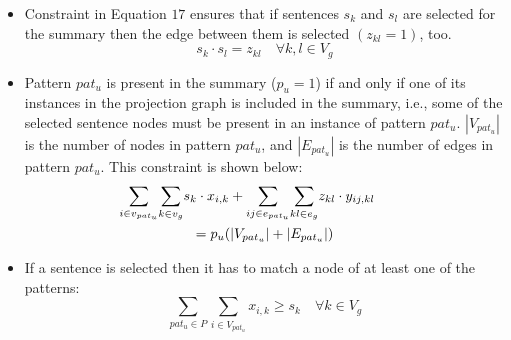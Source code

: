\begin{itemize}

\item Constraint in Equation $17$ ensures that if sentences $s_{k}$ and $s_{l}$ are selected for the summary then the edge between them is selected $(z_{kl}=1)$, too.
\begin{equation}
 s_{k} \cdot s_{l}=z_{kl} \quad \forall k,l \in V_{g}
\end{equation}
%
\item Pattern $pat_u$ is present in the summary ($p_u=1$) if and only if
one of its instances in the projection graph is included in the summary, i.e., some of the selected sentence nodes must be present in an instance of pattern $pat_{u}$.
$|V_{pat_{u}}|$ is the number of nodes in pattern $pat_{u}$, and $|E_{pat_{u}}|$ is the number of edges in pattern $pat_{u}$.
This constraint is shown below:
\begin{multline}
\hspace{-2.5em}
\underset{i\in v_{pat_{u}}}{\sum}\underset{k\in v_{g}}{\sum}s_{k}\cdot x_{i,k}+\underset{ij\in e_{pat_{u}}}{\sum}\underset{kl\in e_{g}}{\sum}z_{kl} \cdot y_{ij,kl}
  \\= p_{u}(|V_{pat_{u}}|+|E_{pat_{u}}|)
%
\end{multline}

\item If a sentence is selected then it has to match a node of at least one of the patterns:
\begin{equation}
\sum_{pat_{u}\in P}\sum_{i\in V_{pat_{u}}}x_{i,k}\geq s_{k} \quad \forall k\in V_{g}
 \end{equation}
\end{itemize}

                                                                                             

